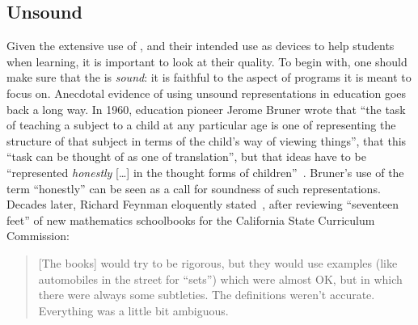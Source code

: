 {

\subsection{Unsound \NMs{}}

Given the extensive use of \nms{},
and
their intended use as devices to help students when learning,
it is important to look at their quality.
To begin with,
one should
make sure that the \nm{} is \emph{sound}:
it is
faithful to the aspect of programs it is meant to focus on.
%
Anecdotal evidence of using unsound representations in education goes back a long way.
%
In 1960, education pioneer Jerome Bruner wrote that
``the task of teaching a subject to a child at any particular age is one of representing the structure of that subject in terms of the child’s way of viewing things'', that this
``task can be thought of as one of translation'', but that ideas have to be
``represented \emph{honestly} […] in the thought forms of children''~\cite{ brunerProcessEducation1960}.
Bruner’s use of the term ``honestly'' can be seen as a call for soundness of such representations.
%
Decades later,
Richard Feynman eloquently stated~\citep{feynmanSurelyYouRe1985},
after reviewing ``seventeen feet'' of new mathematics schoolbooks for the California State Curriculum Commission:

\begin{quote}
    [The books] would try to be rigorous, but they would use examples
    (like automobiles in the street for ``sets'')
    which were almost OK, but in which there were always some subtleties.
    The definitions weren't accurate.
    Everything was a little bit ambiguous.
\end{quote}

}
